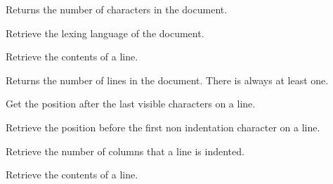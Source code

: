 \label{wxstyledtextctrlgetlength}


Returns the number of characters in the document.


\label{wxstyledtextctrlgetlexer}


Retrieve the lexing language of the document.


\label{wxstyledtextctrlgetline}


Retrieve the contents of a line.


\label{wxstyledtextctrlgetlinecount}


Returns the number of lines in the document. There is always at least one.


\label{wxstyledtextctrlgetlineendposition}


Get the position after the last visible characters on a line.


\label{wxstyledtextctrlgetlineindentposition}


Retrieve the position before the first non indentation character on a line.


\label{wxstyledtextctrlgetlineindentation}


Retrieve the number of columns that a line is indented.


\label{wxstyledtextctrlgetlineraw}


Retrieve the contents of a line.


\label{wxstyledtextctrlgetlineselendposition}


